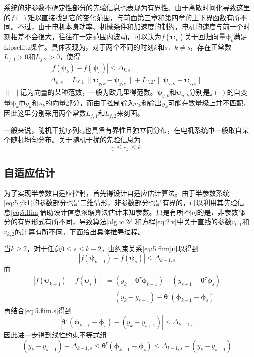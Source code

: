 系统的非参数不确定性部分的先验信息也表现为有界性。由于离散时间化导致这里的$f(\cdot)$难以直接找到它的变化范围，与前面第三章和第四章的上下界函数有所不同。不过，由于电机本身功率、机械条件和加速度的制约，电机的速度与前一个时刻相差不会很大，往往在一定范围内波动，可以认为$f(\bm{\psi}_{k})$关于回归向量$\bm{\psi}_{k}$满足Lipschitz条件。具体表现为，对于两个不同的时刻$k$和$s$，$k\neq s$，存在正常数$L_{f,1}>0$和$L_{f,2}>0$，使得
\begin{equation}\label{eq:5.flim}
\begin{array}{c}
|f(\bm{\psi}_{k})-f(\bm{\psi}_{s})|\leq \Delta_{k,s}\\
\Delta_{k,s}=L_{f,1}\cdot\|\bm{\psi}_{y,k}-\bm{\psi}_{y,s}\|+L_{f,2}\cdot\|\bm{\psi}_{u,k}-\bm{\psi}_{u,s}\|
\end{array}
\end{equation}
$\|\cdot\|$记为向量的某种范数，一般为欧几里得范数。$\bm{\psi}_{y,k}$和$\bm{\psi}_{u,k}$分别是$f(\cdot)$的自变量$\bm{\psi}_{k}$中$y_{k}$和$u_{k}$的向量部分，而由于控制输入$u_{k}$和输出$y_{k}$可能在数量级上并不匹配，因此这里分别采用两个常数$L_{f,1}$和$L_{f,2}$来刻画。

一般来说，随机干扰序列$\epsilon_{k}$也具备有界性且独立同分布，在电机系统中一般取自某个随机均匀分布。关于随机干扰的先验信息为
$$\underline{\epsilon}\leq\epsilon_{k}\leq\overline{\epsilon}.$$

\subsection{自适应估计}\label{5.2.2}
为了实现半参数自适应控制，首先得设计自适应估计算法。由于半参数系统\eqref{eq:5.yk1}的参数部分也是二维情形，非参数部分也是有界的，可以利用其先验信息\eqref{eq:5.flim}借助设计信息浓缩算法估计未知参数。只是有所不同的是，非参数部分的有界形式有所不同，导致算法\ref{alg.ic.2d}和方程\eqref{eq:2.v}中关于直线的参数$v_{k,1}$和$v_{k,2}$的计算有所不同。下面给出具体推导过程。

当$k\geq2$，对于任意$0\leq s\leq k-2$，由约束关系\eqref{eq:5.flim}可以得到
\begin{equation}\label{eq:5.flim.s}
|f(\bm{\psi}_{k-1})-f(\bm{\psi}_{s})|\leq \Delta_{k-1,s}
\end{equation}
而
\begin{equation*}
\begin{split}%
|f(\bm{\psi}_{k-1})-f(\bm{\psi}_{s})|&=(y_{k}-\bm{\theta}^{\tau}\bm{\phi}_{k-1})-(y_{s+1}-\bm{\theta}^{\tau}\bm{\phi}_{s})\\
&=(y_{k}-y_{s+1})-\bm{\theta}^{\tau}(\bm{\phi}_{k-1}-\bm{\phi}_{s})
\end{split}
\end{equation*}
再结合\eqref{eq:5.flim.s}得到
\begin{equation}\label{eq:5.}
|\bm{\theta}^{\tau}(\bm{\phi}_{k-1}-\bm{\phi}_{s})-(y_{k}-y_{s+1})| \leq \Delta_{k-1,s}
\end{equation}
因此进一步得到线性约束不等式组
\begin{equation}\label{eq:5.theta.lim.k}
(y_{k}-y_{s+1})-\Delta_{k-1,s}\leq\bm{\theta}^{\tau}(\bm{\phi}_{k-1}-\bm{\phi}_{s})\leq\Delta_{k-1,s}+(y_{k}-y_{s+1})
\end{equation}

